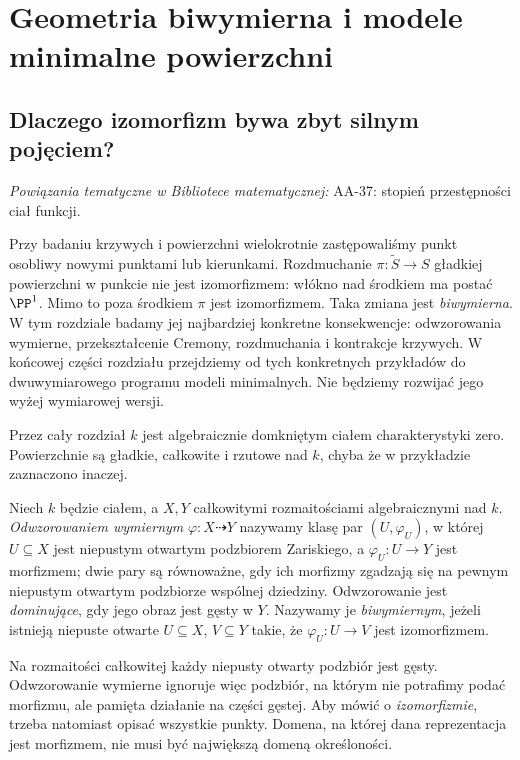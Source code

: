 \chapter{Geometria biwymierna i modele minimalne powierzchni}
\label{ch:ga8-biwymierna}

\providecommand{\atlasref}[2]{#2}


\section{Dlaczego izomorfizm bywa zbyt silnym pojęciem?}
\label{sec:ga8-motivation}

\noindent\emph{Powiązania tematyczne w Bibliotece matematycznej:} \atlasref{AA-37::aa:tw:transcendence-degree}{AA-37: stopień przestępności ciał funkcji}.


Przy badaniu krzywych i powierzchni wielokrotnie zastępowaliśmy
punkt osobliwy nowymi punktami lub kierunkami. Rozdmuchanie
$\pi:\widetilde S\to S$ gładkiej powierzchni w punkcie
nie jest izomorfizmem: włókno nad środkiem ma postać $\PP^1$.
Mimo to poza środkiem $\pi$ jest izomorfizmem. Taka zmiana
jest \emph{biwymierna}. W tym rozdziale badamy jej najbardziej
konkretne konsekwencje: odwzorowania wymierne, przekształcenie
Cremony, rozdmuchania i kontrakcje krzywych.
W końcowej części rozdziału przejdziemy od tych
konkretnych przykładów do dwuwymiarowego programu
modeli minimalnych. Nie będziemy rozwijać jego
wyżej wymiarowej wersji.

Przez cały rozdział $k$ jest algebraicznie domkniętym ciałem
charakterystyki zero. Powierzchnie są gładkie, całkowite i
rzutowe nad $k$, chyba że w przykładzie zaznaczono inaczej.

\begin{definicja}
\label{def:ga8-rational}
Niech $k$ będzie ciałem, a $X,Y$ całkowitymi rozmaitościami
algebraicznymi nad $k$. \emph{Odwzorowaniem wymiernym} $\varphi:X\dashrightarrow Y$
nazywamy klasę par $(U,\varphi_U)$, w której $U\subseteq X$
jest niepustym otwartym podzbiorem Zariskiego, a
$\varphi_U:U\to Y$ jest morfizmem; dwie pary są równoważne,
gdy ich morfizmy zgadzają się na pewnym niepustym
otwartym podzbiorze wspólnej dziedziny. Odwzorowanie jest
\emph{dominujące}, gdy jego obraz jest gęsty w $Y$.
Nazywamy je \emph{biwymiernym}, jeżeli istnieją niepuste
otwarte $U\subseteq X$, $V\subseteq Y$ takie, że
$\varphi_U:U\to V$ jest izomorfizmem.
\end{definicja}

\begin{uwaga}
Na rozmaitości całkowitej każdy niepusty otwarty
podzbiór jest gęsty. Odwzorowanie wymierne ignoruje
więc podzbiór, na którym nie potrafimy podać morfizmu,
ale pamięta działanie na części gęstej. Aby mówić o
\emph{izomorfizmie}, trzeba natomiast opisać wszystkie punkty.
Domena, na której dana reprezentacja jest morfizmem,
nie musi być największą domeną określoności.
\end{uwaga}

